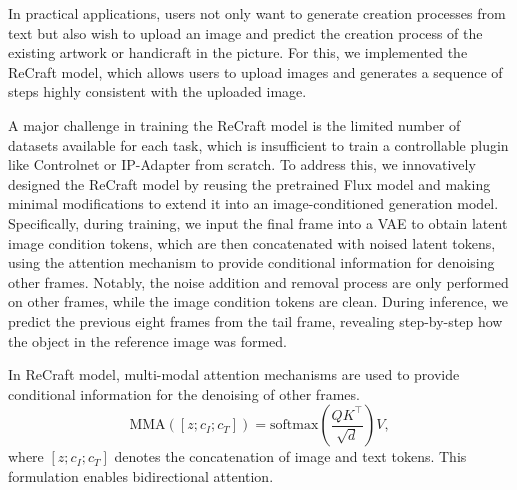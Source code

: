 


In practical applications, users not only want to generate creation processes from text but also wish to upload an image and predict the creation process of the existing artwork or handicraft in the picture. For this, we implemented the ReCraft model, which allows users to upload images and generates a sequence of steps highly consistent with the uploaded image.

A major challenge in training the ReCraft model is the limited number of datasets available for each task, which is insufficient to train a controllable plugin like Controlnet or IP-Adapter from scratch. To address this, we innovatively designed the ReCraft model by reusing the pretrained Flux model and making minimal modifications to extend it into an image-conditioned generation model. Specifically, during training, we input the final frame into a VAE to obtain latent image condition tokens, which are then concatenated with noised latent tokens, using the attention mechanism to provide conditional information for denoising other frames. Notably, the noise addition and removal process are only performed on other frames, while the image condition tokens are clean. During inference, we predict the previous eight frames from the tail frame, revealing step-by-step how the object in the reference image was formed.

In ReCraft model, multi-modal attention mechanisms are used to provide conditional information for the denoising of other frames. 
\begin{equation}
\text{MMA}([z; c_I; c_T]) = \text{softmax}\left(\frac{QK^\top}{\sqrt{d}}\right)V,
\end{equation}
where $[z; c_I; c_T]$ denotes the concatenation of image and text tokens. This formulation enables bidirectional attention.

